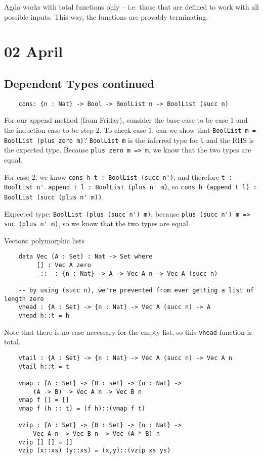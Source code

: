 \documentclass[11pt]{article}
\begin{document}
Agda works with total functions only -- i.e. those that are defined to work with all possible inputs. This way, the functions are provably terminating.

\section{02 April}
\subsection{Dependent Types continued}
\begin{verbatim}
    cons: {n : Nat} -> Bool -> BoolList n -> BoolList (succ n)
\end{verbatim}

For our append method (from Friday), consider the base case to be case 1 and the induction case to be step 2. To check case 1, can we show that \verb~BoolList m = BoolList (plus zero m)~? \verb~BoolList m~ is the inferred type for \verb~l~ and the RHS is the expected type. Because \verb~plus zero m => m~, we know that the two types are equal. 

For case 2, we know \verb~cons h t : BoolList (succ n')~, and therefore \verb~t : BoolList n'~. \verb~append t l : BoolList (plus n' m)~, so \verb~cons h (append t l) : BoolList (succ (plus n' m))~.

Expected type: \verb~BoolList (plus (succ n') m)~, because \verb~plus (succ n') m => suc (plus n' m)~, so we know that the two types are equal.

Vectors: polymorphic lists
\begin{verbatim}
    data Vec (A : Set) : Nat -> Set where
         [] : Vec A zero
         _::_ : {n : Nat} -> A -> Vec A n -> Vec A (succ n)

    -- by using (succ n), we're prevented from ever getting a list of length zero
    vhead : {A : Set} -> {n : Nat} -> Vec A (succ n) -> A
    vhead h::t = h
\end{verbatim}
Note that there is no case necessary for the empty list, so this \verb~vhead~ function is total.

\begin{verbatim}
    vtail : {A : Set} -> {n : Nat} -> Vec A (succ n) -> Vec A n
    vtail h::t = t

    vmap : {A : Set} -> {B : set} -> {n : Nat} ->
        (A -> B) -> Vec A n -> Vec B n
    vmap f [] = []
    vmap f (h :: t) = (f h)::(vmap f t)

    vzip : {A : Set} -> {B : Set} -> {n : Nat} ->
        Vec A n -> Vec B n -> Vec (A * B) n
    vzip [] [] = []
    vzip (x::xs) (y::xs) = (x,y)::(vzip xs ys)
\end{verbatim}
\end{document}
